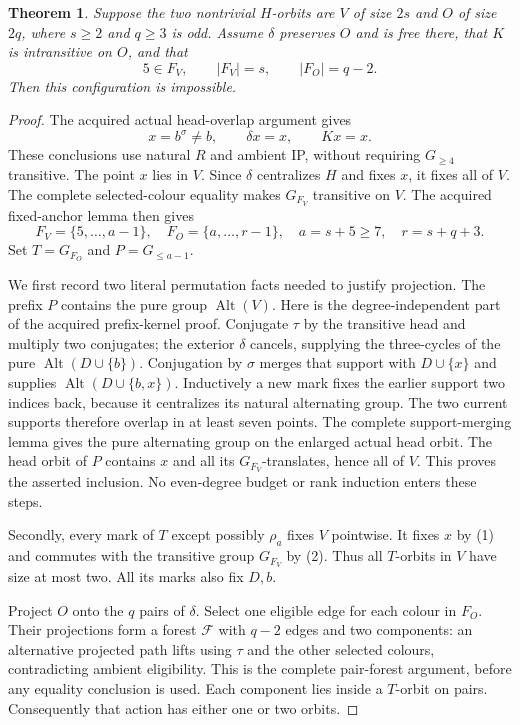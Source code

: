 \documentclass[11pt,a4paper]{article}
\newtheorem{theorem}{Theorem}
\newcommand{\Alt}{\operatorname{Alt}}
\begin{document}
\begin{theorem}
Suppose the two nontrivial $H$-orbits are $V$ of size
$2s$ and $O$ of size $2q$, where $s\ge2$ and $q\ge3$
is odd. Assume $\delta$ preserves $O$ and is free there,
that $K$ is intransitive on $O$, and that
\[
        5\in F_V,\qquad |F_V|=s,\qquad |F_O|=q-2.
\]
Then this configuration is impossible.
\end{theorem}
\begin{proof}
The acquired actual head-overlap argument gives
\[
 x=b^\sigma\ne b,\qquad \delta x=x,\qquad Kx=x.
                                                        \tag{1}
\]
These conclusions use natural $R$ and ambient IP, without
requiring $G_{\ge4}$ transitive. The point $x$ lies in $V$.
Since $\delta$ centralizes $H$ and fixes $x$, it fixes
all of $V$. The complete selected-colour equality makes
$G_{F_V}$ transitive on $V$. The acquired fixed-anchor
lemma then gives
\[
 F_V=\{5,\ldots,a-1\},\quad F_O=\{a,\ldots,r-1\},
 \quad a=s+5\ge7,\quad r=s+q+3.                       \tag{2}
\]
Set $T=G_{F_O}$ and $P=G_{\le a-1}$.

We first record two literal permutation facts needed
to justify projection. The prefix $P$ contains the pure
group $\Alt(V)$. Here is the degree-independent part of
the acquired prefix-kernel proof. Conjugate $\tau$ by
the transitive head and multiply two conjugates; the
exterior $\delta$ cancels, supplying the three-cycles
of the pure $\Alt(D\cup\{b\})$. Conjugation by $\sigma$
merges that support with $D\cup\{x\}$ and supplies
$\Alt(D\cup\{b,x\})$. Inductively a new mark fixes
the earlier support two indices back, because it
centralizes its natural alternating group. The two
current supports therefore overlap in at least seven
points. The complete support-merging lemma gives
the pure alternating group on the enlarged actual
head orbit. The head orbit of $P$ contains $x$ and
all its $G_{F_V}$-translates, hence all of $V$.
This proves the asserted inclusion. No even-degree
budget or rank induction enters these steps.

Secondly, every mark of $T$ except possibly $\rho_a$
fixes $V$ pointwise. It fixes $x$ by (1) and commutes
with the transitive group $G_{F_V}$ by (2). Thus all
$T$-orbits in $V$ have size at most two. All its marks
also fix $D,b$.

Project $O$ onto the $q$ pairs of $\delta$. Select one
eligible edge for each colour in $F_O$. Their projections
form a forest $\mathcal F$ with $q-2$ edges and two
components: an alternative projected path lifts using
$\tau$ and the other selected colours, contradicting
ambient eligibility. This is the complete pair-forest
argument, before any equality conclusion is used.
Each component lies inside a $T$-orbit on pairs.
Consequently that action has either one or two orbits.


\end{proof}
\end{document}
